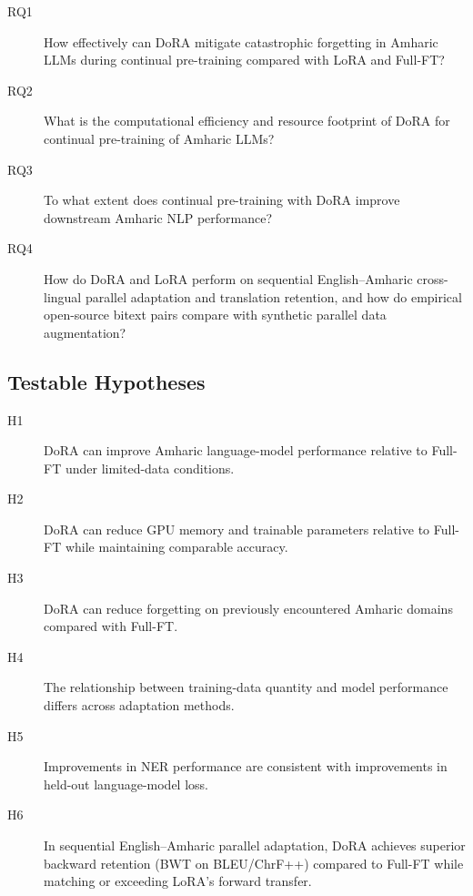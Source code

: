 \documentclass[11pt,a4paper]{article}
\begin{document}
\begin{description}
  \item[RQ1] How effectively can DoRA mitigate catastrophic forgetting
        in Amharic LLMs during continual pre-training compared with
        LoRA and Full-FT?
  \item[RQ2] What is the computational efficiency and resource
        footprint of DoRA for continual pre-training of Amharic LLMs?
  \item[RQ3] To what extent does continual pre-training with DoRA
        improve downstream Amharic NLP performance?
  \item[RQ4] How do DoRA and LoRA perform on sequential English--Amharic
        cross-lingual parallel adaptation and translation retention, and
        how do empirical open-source bitext pairs compare with synthetic
        parallel data augmentation?
\end{description}

\subsection{Testable Hypotheses}

\begin{description}
  \item[H1] DoRA can improve Amharic language-model performance
        relative to Full-FT under limited-data conditions.
  \item[H2] DoRA can reduce GPU memory and trainable parameters
        relative to Full-FT while maintaining comparable accuracy.
  \item[H3] DoRA can reduce forgetting on previously encountered
        Amharic domains compared with Full-FT.
  \item[H4] The relationship between training-data quantity and model
        performance differs across adaptation methods.
  \item[H5] Improvements in NER performance are consistent with
        improvements in held-out language-model loss.
  \item[H6] In sequential English--Amharic parallel adaptation, DoRA
        achieves superior backward retention (BWT on BLEU/ChrF++)
        compared to Full-FT while matching or exceeding LoRA's forward
        transfer.
\end{description}

\end{document}

